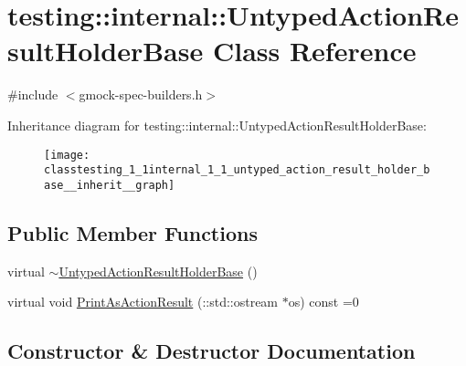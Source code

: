 \hypertarget{classtesting_1_1internal_1_1_untyped_action_result_holder_base}{}\section{testing\+:\+:internal\+:\+:Untyped\+Action\+Result\+Holder\+Base Class Reference}
\label{classtesting_1_1internal_1_1_untyped_action_result_holder_base}


{\ttfamily \#include $<$gmock-\/spec-\/builders.\+h$>$}



Inheritance diagram for testing\+:\+:internal\+:\+:Untyped\+Action\+Result\+Holder\+Base\+:
\nopagebreak
\begin{figure}[H]
\begin{center}
\leavevmode
\texttt{[image: classtesting\_1\_1internal\_1\_1\_untyped\_action\_result\_holder\_base\_\_inherit\_\_graph]}
\end{center}
\end{figure}
\subsection*{Public Member Functions}
\begin{DoxyCompactItemize}
\item 
virtual \hyperlink{classtesting_1_1internal_1_1_untyped_action_result_holder_base_a2e6c331d249aea75ccc1e4fba3897a29}{$\sim$\+Untyped\+Action\+Result\+Holder\+Base} ()
\item 
virtual void \hyperlink{classtesting_1_1internal_1_1_untyped_action_result_holder_base_a4b4a558fcb1d3b02c0fec34f186d3b90}{Print\+As\+Action\+Result} (\+::std\+::ostream $\ast$os) const =0
\end{DoxyCompactItemize}


\subsection{Constructor \& Destructor Documentation}
